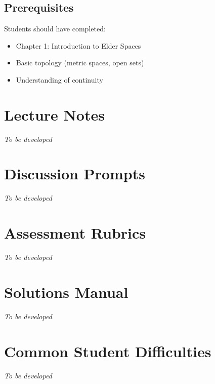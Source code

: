 \documentclass[12pt,a4paper]{article}
\begin{document}
\subsection{Prerequisites}

Students should have completed:
\begin{itemize}
    \item Chapter 1: Introduction to Elder Spaces
    \item Basic topology (metric spaces, open sets)
    \item Understanding of continuity
\end{itemize}

\section{Lecture Notes}

\textit{To be developed}

\section{Discussion Prompts}

\textit{To be developed}

\section{Assessment Rubrics}

\textit{To be developed}

\section{Solutions Manual}

\textit{To be developed}

\section{Common Student Difficulties}

\textit{To be developed}
\end{document}

